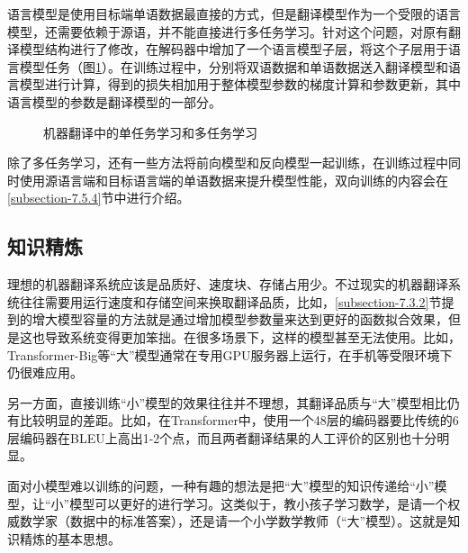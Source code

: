 \parinterval 语言模型是使用目标端单语数据最直接的方式，但是翻译模型作为一个受限的语言模型，还需要依赖于源语，并不能直接进行多任务学习。针对这个问题，对原有翻译模型结构进行了修改，在解码器中增加了一个语言模型子层，将这个子层用于语言模型任务（图\ref{fig:7-40}）。在训练过程中，分别将双语数据和单语数据送入翻译模型和语言模型进行计算，得到的损失相加用于整体模型参数的梯度计算和参数更新，其中语言模型的参数是翻译模型的一部分。

\begin{figure}[htp]
\centering

\caption{机器翻译中的单任务学习和多任务学习}
\label{fig:7-40}
\end{figure}

\parinterval 除了多任务学习，还有一些方法将前向模型和反向模型一起训练，在训练过程中同时使用源语言端和目标语言端的单语数据来提升模型性能，双向训练的内容会在\ref{subsection-7.5.4}节中进行介绍。


\subsection{知识精炼}
\label{subsection-7.5.3}

\parinterval 理想的机器翻译系统应该是品质好、速度块、存储占用少。不过现实的机器翻译系统往往需要用运行速度和存储空间来换取翻译品质，比如，\ref{subsection-7.3.2}节提到的增大模型容量的方法就是通过增加模型参数量来达到更好的函数拟合效果，但是这也导致系统变得更加笨拙。在很多场景下，这样的模型甚至无法使用。比如，Transformer-Big等``大''模型通常在专用GPU服务器上运行，在手机等受限环境下仍很难应用。

\parinterval 另一方面，直接训练``小''模型的效果往往并不理想，其翻译品质与``大''模型相比仍有比较明显的差距。比如，在Transformer中，使用一个48层的编码器要比传统的6层编码器在BLEU上高出1-2个点，而且两者翻译结果的人工评价的区别也十分明显。

\parinterval 面对小模型难以训练的问题，一种有趣的想法是把``大''模型的知识传递给``小''模型，让``小''模型可以更好的进行学习。这类似于，教小孩子学习数学，是请一个权威数学家（数据中的标准答案），还是请一个小学数学教师（``大''模型）。这就是知识精炼的基本思想。


